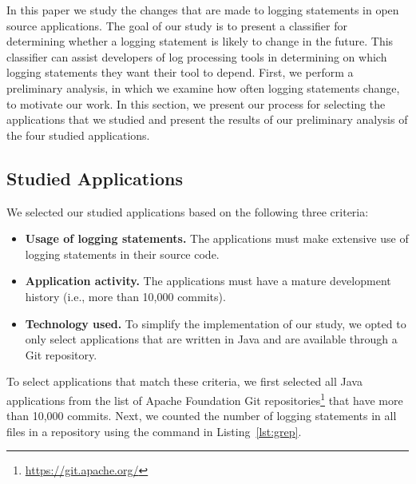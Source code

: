 In this paper we study the changes that are made to logging statements in open source applications. The goal of our study is to present a classifier for determining whether a logging statement is likely to change in the future. This classifier can assist developers of log processing tools in determining on which logging statements they want their tool to depend. %
First, we perform a preliminary analysis, in which we examine how often logging statements change, to motivate our work. In this section, we present our process for selecting the applications that we studied and present the results of our preliminary analysis of the four studied applications. 


\subsection{Studied Applications}
We selected our studied applications based on the following three criteria:
\begin{itemize}
	\item \textbf{Usage of logging statements.} The applications must make extensive use of logging statements in their source code.
	\item \textbf{Application activity.} The applications must have a mature development history (i.e., more than 10,000 commits).
	\item \textbf{Technology used.} To simplify the implementation of our study, we opted to only select applications that are written in Java and are available through a Git repository.
	
\end{itemize}

To select applications that match these criteria, we first selected all Java applications from the list of Apache Foundation Git repositories\footnote{\url{https://git.apache.org/}} that have more than 10,000 commits. Next, we counted the number of logging statements in all  files in a repository using the  command in Listing~\ref{lst:grep}.


